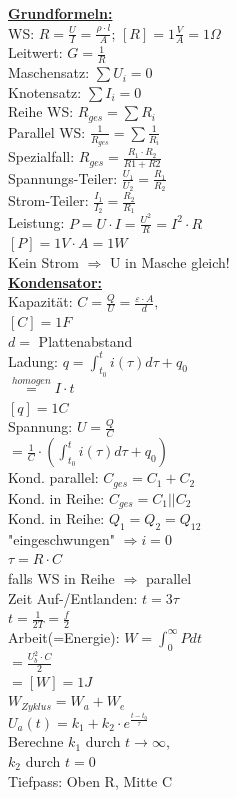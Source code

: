 \documentclass[11pt]{article}
\begin{document}
\begin{minipage}{0.33\textwidth}

\underline{\textbf{Grundformeln:}}\\
WS: $R = \frac{U}{I} = \frac{\rho \cdot l}{A}$; $[R] = 1\frac{V}{A} =1 \Omega$\\
Leitwert: $G = \frac{1}{R}$\\
Maschensatz: $\sum U_i = 0$\\
Knotensatz: $\sum I_i = 0$\\
Reihe WS: $R_{ges} = \sum R_i$\\
Parallel WS: $\frac{1}{R_{ges}} = \sum \frac{1}{R_i}$\\
\phantom{ss} Spezialfall: $R_{ges} = \frac{R_1 \cdot R_2}{R1+R2} $\\
Spannungs-Teiler: $\frac{U_1}{U_2} = \frac{R_1}{R_2}$\\
Strom-Teiler: $\frac{I_1}{I_2} = \frac{R_2}{R_1}$\\
Leistung: $P =U \cdot I = \frac{U^2}{R} = I^2 \cdot R $ \\
\phantom{ssssssssss} $[P] = 1V \cdot A =1 W$\\
Kein Strom $\Rightarrow$ U in Masche gleich!\\

\underline{\textbf{Kondensator:}}\\
Kapazität: $C = \frac{Q}{U} = \frac{\varepsilon \cdot A }{d},$\\
\phantom{ssssssssssii} $[C]=1F$\\
\phantom{sssssssssssii} $d =$ Plattenabstand\\
Ladung: $q = \int_{t_0}^t i(\tau) d\tau + q_0$\\
\phantom{sssssssis} $\stackrel{homogen}{=} I \cdot t$\\
\phantom{ssssssssssii} $[q]=1C$\\
Spannung: $U = \frac{Q}{C}$\\
\phantom{ssi} $= \frac{1}{C} \cdot (\int_{t_0}^t i(\tau) d\tau + q_0)$\\
Kond. parallel: $C_{ges} = C_1 + C_2$\\
Kond. in Reihe: $C_{ges} = C_1 || C_2$\\
Kond. in Reihe: $Q_1 = Q_2 = Q_{12}$\\
"eingeschwungen" $\Rightarrow i = 0$\\
$\tau = R \cdot C$\\
\phantom{ss}falls WS in Reihe $\Rightarrow$ parallel\\
Zeit Auf-/Entlanden: $t = 3\tau$\\
$t =\frac{1}{2T} = \frac{f}{2}$\\
Arbeit(=Energie): $W = \int_0^\infty P dt$\\
\phantom{sssssssss} $= \frac{U_b^2 \cdot C}{2} $\\
\phantom{sssssssss} $= [W] = 1J $\\
$W_{Zyklus} = W_a + W_e$\\
$U_a(t) = k_1 + k_2 \cdot e^{\frac{t-t_0}{\tau}}$\\
Berechne $k_1$ durch $t \rightarrow \infty$,\\
$k_2$ durch $t = 0$\\

Tiefpass: Oben R, Mitte C
\end{minipage}%
\end{document}
